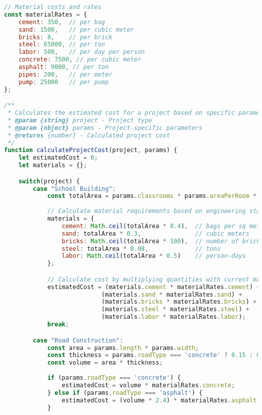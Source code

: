\documentclass[12pt,a4paper]{report}
\begin{document}
\begin{lstlisting}[language=JavaScript]
// Material costs and rates
const materialRates = {
    cement: 350,  // per bag
    sand: 1500,   // per cubic meter
    bricks: 8,    // per brick
    steel: 65000, // per ton
    labor: 500,   // per day per person
    concrete: 7500, // per cubic meter
    asphalt: 9000, // per ton
    pipes: 200,   // per meter
    pump: 25000   // per pump
};

/**
 * Calculates the estimated cost for a project based on specific parameters
 * @param {string} project - Project type
 * @param {object} params - Project-specific parameters
 * @returns {number} - Calculated project cost
 */
function calculateProjectCost(project, params) {
    let estimatedCost = 0;
    let materials = {};

    switch(project) {
        case "School Building":
            const totalArea = params.classrooms * params.areaPerRoom * params.floors;
            
            // Calculate material requirements based on engineering standards
            materials = {
                cement: Math.ceil(totalArea * 0.4),  // bags per sq meter
                sand: totalArea * 0.3,               // cubic meters
                bricks: Math.ceil(totalArea * 100),  // number of bricks
                steel: totalArea * 0.08,             // tons
                labor: Math.ceil(totalArea * 0.5)    // person-days
            };

            // Calculate cost by multiplying quantities with current market rates
            estimatedCost = (materials.cement * materialRates.cement) +
                           (materials.sand * materialRates.sand) +
                           (materials.bricks * materialRates.bricks) +
                           (materials.steel * materialRates.steel) +
                           (materials.labor * materialRates.labor);
            break;

        case "Road Construction":
            const area = params.length * params.width;
            const thickness = params.roadType === 'concrete' ? 0.15 : 0.1; // meters
            const volume = area * thickness;
            
            if (params.roadType === 'concrete') {
                estimatedCost = volume * materialRates.concrete;
            } else if (params.roadType === 'asphalt') {
                estimatedCost = (volume * 2.4) * materialRates.asphalt; // 2.4 tons per cubic meter
            }
            

\end{lstlisting}
\end{document}
